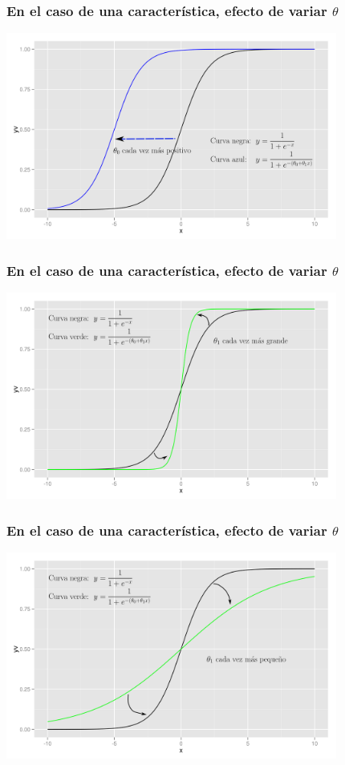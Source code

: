 \documentclass{beamer}
\begin{document}
  \begin{frame}\frametitle{En el caso de una característica, efecto de variar $\theta$}
\begin{center}
  \includegraphics[height=6.8cm]{sigmoidtheta2-ink.png}
\end{center}
 \end{frame}
 \begin{frame}\frametitle{En el caso de una característica, efecto de variar $\theta$}
\begin{center}
  \includegraphics[height=6.8cm]{sigmoidtheta3-ink.png}
\end{center}
 \end{frame}
 \begin{frame}\frametitle{En el caso de una característica, efecto de variar $\theta$}
\begin{center}
  \includegraphics[height=6.8cm]{sigmoidtheta4-ink.png}
\end{center}
 \end{frame}
\end{document}
